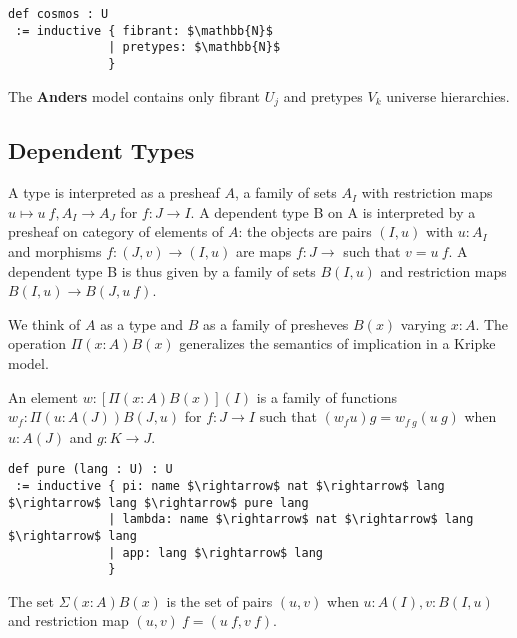 \documentclass{article}
\begin{document}
\begin{lstlisting}[mathescape=true]
def cosmos : U
 := inductive { fibrant: $\mathbb{N}$
              | pretypes: $\mathbb{N}$
              }
\end{lstlisting}

The \textbf{Anders} model contains only fibrant $U_j$ and pretypes $V_k$ universe hierarchies.

\newpage

\subsection{Dependent Types}

\begin{definition}[Type]
A type is interpreted as a presheaf $A$, a family of sets $A_I$ with restriction maps
$u \mapsto u\ f, A_I \rightarrow A_J$ for $f: J\rightarrow I$. A dependent type
B on A is interpreted by a presheaf on category of elements of $A$: the objects
are pairs $(I,u)$ with $u : A_I$ and morphisms $f: (J,v) \rightarrow (I,u)$ are
maps $f : J \rightarrow$ such that $v = u\ f$. A dependent type B is thus given
by a family of sets $B(I,u)$ and restriction maps $B(I,u) \rightarrow B(J,u\ f)$.
\end{definition}


We think of $A$ as a type and $B$ as a family of presheves $B(x)$ varying $x:A$.
The operation $\Pi(x:A)B(x)$ generalizes the semantics of
implication in a Kripke model.

\begin{definition}[Pi]
An element $w:[\Pi(x:A)B(x)](I)$ is a family of functions $w_f : \Pi(u:A(J))B(J,u)$
for $f : J \rightarrow I$ such that $(w_f u)g=w_{f\ g}(u\ g)$ when $u:A(J)$ and $g:K\rightarrow J$.
\end{definition}

\begin{lstlisting}[mathescape=true]
def pure (lang : U) : U
 := inductive { pi: name $\rightarrow$ nat $\rightarrow$ lang $\rightarrow$ lang $\rightarrow$ pure lang
              | lambda: name $\rightarrow$ nat $\rightarrow$ lang $\rightarrow$ lang
              | app: lang $\rightarrow$ lang
              }
\end{lstlisting}

\begin{definition}[Sigma]
The set $\Sigma(x:A)B(x)$ is the set of pairs $(u,v)$ when $u:A(I),v:B(I,u)$ and
restriction map $(u,v)\ f=(u\ f,v\ f)$.
\end{definition}
\end{document}
